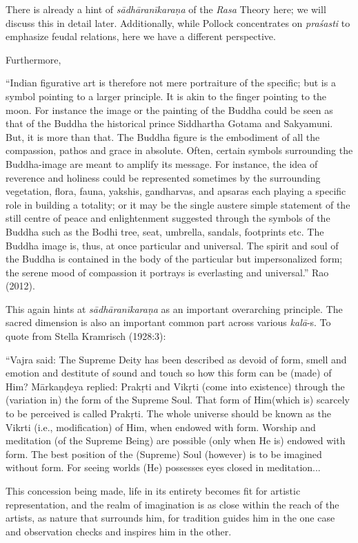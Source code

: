 There is already a hint of \textsl{sādhāranīkaraṇa} of the \textsl{Rasa} Theory here; we will discuss this in detail later. Additionally, while Pollock concentrates on \textsl{praśasti} to emphasize feudal relations, here we have a different perspective. 

Furthermore, 

\begin{myquote}
“Indian figurative art is therefore not mere portraiture of the specific; but is a symbol pointing to a larger principle. It is akin to the finger pointing to the moon. For instance the image or the painting of the Buddha could be seen as that of the Buddha the historical prince Siddhartha Gotama and Sakyamuni. But, it is more than that. The Buddha figure is the embodiment of all the compassion, pathos and grace in absolute. Often, certain symbols surrounding the Buddha-image are meant to amplify its message. For instance, the idea of reverence and holiness could be represented sometimes by the surrounding vegetation, flora, fauna, yakshis, gandharvas, and apsaras each playing a specific role in building a totality; or it may be the single austere simple statement of the still centre of peace and enlightenment suggested through the symbols of the Buddha such as the Bodhi tree, seat, umbrella, sandals, footprints etc. The Buddha image is, thus, at once particular and universal. The spirit and soul of the Buddha is contained in the body of the particular but impersonalized form; the serene mood of compassion it portrays is everlasting and universal.” Rao (2012).
\end{myquote}

This again hints at \textsl{sādhāranīkaraṇa} as an important overarching principle. The sacred dimension is also an important common part across various \textsl{kalā}-s. To quote from Stella Kramrisch (1928:3):

\begin{myquote}
“Vajra said: The Supreme Deity has been described as devoid of form, smell and emotion and destitute of sound and touch so how this form can be (made) of Him? Mārkaṇḍeya replied: Prakṛti and Vikṛti (come into existence) through the (variation in) the form of the Supreme Soul. That form of Him(which is) scarcely to be perceived is called Prakṛti. The whole universe should be known as the Vikrti (i.e., modification) of Him, when endowed with form. Worship and meditation (of the Supreme Being) are possible (only when He is) endowed with form. The best position of the (Supreme) Soul (however) is to be imagined without form. For seeing worlds (He) possesses eyes closed in meditation... 

This concession being made, life in its entirety becomes fit for artistic representation, and the realm of imagination is as close within the reach of the artists, as nature that surrounds him, for tradition guides him in the one case and observation checks and inspires him in the other. 
\end{myquote}

